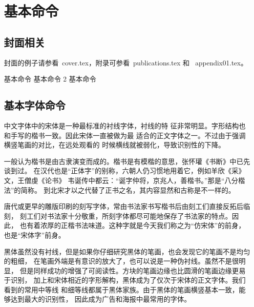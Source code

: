 

\chapter{基本命令}
\label{cha:command}


\section{封面相关}
\label{sec:cover}

封面的例子请参看~cover.tex，附录可参看~publications.tex 和
~appendix01.tex。

{ 基本命令}
{ 基本命令}
2 基本命令

\section{基本字体命令}
\label{sec:font}

中文字体中的宋体是一种最标准的衬线字体，衬线的特
征非常明显。字形结构也和手写的楷书一致。因此宋体一直被做为最
适合的正文字体之一。不过由于强调横竖笔画的对比，在远处观看的
时候横线就被弱化，导致识别性的下降。

{\kai
一般认为楷书是由古隶演变而成的。楷书是有模楷的意思，张怀瓘《书断》中已先谈到过。
在汉代也是“正体字”的别称，六朝人仍习惯地用着它，例如羊欣《采》文，王僧虔《论书》
韦诞传中都云：“诞字仲将，京兆人，善楷书。”那是“八分楷法”的简称。
到北宋才以之代替了正书之名，其内容显然和古称是不一样的。}

{\fs
唐代或更早的雕版印刷的刻写字体，常由书法家书写楷书后由刻工们直接反拓后临刻，
刻工们对书法家十分敬重，所刻字体都尽可能地保存了书法家的特点。因此，
也有着浓厚的正楷书法味道。这种字就是今天我们称之为“仿宋体”的前身，
也是“宋体字”前身。}


{\hei
黑体虽然没有衬线，但是如果你仔细研究黑体的笔画，也会发现它的笔画不是均匀的粗细，
在笔画外端是有意识的放大了，也可以说是一种伪衬线。虽然不是很明显，
但是同样成功的增强了可阅读性。方块的笔画边缘也比圆滑的笔画边缘更易于识别，
加上和宋体相近的字形解构，黑体成为了仅次于宋体的正文字体。我们看到的常用中等线
和细等线都属于黑体家族。由于黑体的笔画横竖基本一致，能够达到最大的识别性，
因此成为广告和海报中最常用的字体。}

